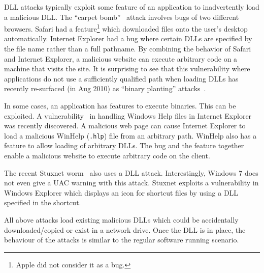 DLL attacks typically exploit some feature of an application
to inadvertently load a malicious DLL.
The ``carpet bomb''~\cite{safari-carpet-bomb} attack involves bugs of two different
browsers.
Safari had a feature\footnote{
Apple did not consider it as a bug.
}
which downloaded files onto the user's desktop automatically.
Internet Explorer had a bug where certain DLLs are specified
by the file name rather than a full pathname.
By combining the behavior of Safari and Internet Explorer,
a malicious website can execute arbitrary code on a machine 
that visits the site.
It is surprising to see that this vulnerability where applications
do not use a sufficiently qualified path when loading DLLs
has recently re-surfaced
(in Aug 2010) as ``binary planting'' attacks~\cite{binary-planting}.

In some cases, an application has features to execute binaries.
This can be exploited.
A vulnerability~\cite{winhelp-attack} in handling Windows Help files in
Internet Explorer was recently discovered.
A malicious web page can cause Internet Explorer to load a malicious
WinHelp ({\tt .hlp}) file from an arbitrary path.
WinHelp also has a feature to allow loading of arbitrary DLLs.
The bug and the feature together enable a malicious website to execute
arbitrary code on the client.

The recent Stuxnet worm~\cite{matrosov2010stuxnet} also uses a DLL attack.
Interestingly, Windows 7 does not even give a UAC warning with this attack.
Stuxnet exploits a vulnerability in Windows Explorer which displays an icon
for shortcut files by using a DLL specified in the shortcut.

All above attacks load existing malicious DLLs which could be accidentally
downloaded/copied or exist in a network drive.
Once the DLL is in place, the behaviour of the attacks is similar to the
regular software running scenario.
